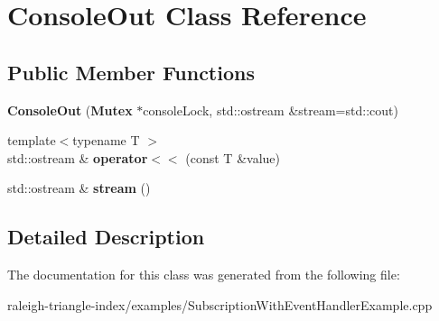\section{Console\+Out Class Reference}
\label{class_console_out}
\subsection*{Public Member Functions}
\begin{DoxyCompactItemize}
\item 
{\bfseries Console\+Out} ({\bf Mutex} $\ast$console\+Lock, std\+::ostream \&stream=std\+::cout)\label{class_console_out_adeb3aa189b0df86bcaaecd2a072b39c2}

\item 
{\footnotesize template$<$typename T $>$ }\\std\+::ostream \& {\bfseries operator$<$$<$} (const T \&value)\label{class_console_out_aa4ac063dd36d8b73a745e822e6eb7f13}

\item 
std\+::ostream \& {\bfseries stream} ()\label{class_console_out_ad151a7152784c5d476c459fce84d6ee9}

\end{DoxyCompactItemize}


\subsection{Detailed Description}


The documentation for this class was generated from the following file\+:\begin{DoxyCompactItemize}
\item 
raleigh-\/triangle-\/index/examples/Subscription\+With\+Event\+Handler\+Example.\+cpp\end{DoxyCompactItemize}
